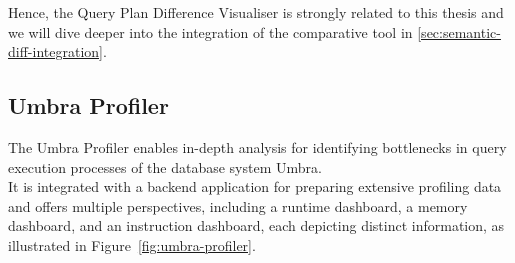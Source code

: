 Hence, the Query Plan Difference Visualiser is strongly related to this thesis and we will dive deeper into the integration of the comparative tool in \ref{sec:semantic-diff-integration}.



\subsection{Umbra Profiler}
The Umbra Profiler \parencite*{umbra-profiler-schott,umbra-profiler-schworm} enables in-depth analysis for identifying bottlenecks in query execution processes of the database system Umbra.
\\ It is integrated with a backend application for preparing extensive profiling data and offers multiple perspectives, including a runtime dashboard, a memory dashboard, and an instruction dashboard, each depicting distinct information, as illustrated in Figure~\ref{fig:umbra-profiler}.

